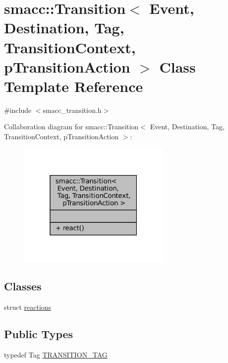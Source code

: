 \hypertarget{classsmacc_1_1Transition}{}\section{smacc\+:\+:Transition$<$ Event, Destination, Tag, Transition\+Context, p\+Transition\+Action $>$ Class Template Reference}
\label{classsmacc_1_1Transition}


{\ttfamily \#include $<$smacc\+\_\+transition.\+h$>$}



Collaboration diagram for smacc\+:\+:Transition$<$ Event, Destination, Tag, Transition\+Context, p\+Transition\+Action $>$\+:
\nopagebreak
\begin{figure}[H]
\begin{center}
\leavevmode
\includegraphics[width=211pt]{classsmacc_1_1Transition__coll__graph}
\end{center}
\end{figure}
\subsection*{Classes}
\begin{DoxyCompactItemize}
\item 
struct \hyperlink{structsmacc_1_1Transition_1_1reactions}{reactions}
\end{DoxyCompactItemize}
\subsection*{Public Types}
\begin{DoxyCompactItemize}
\item 
typedef Tag \hyperlink{classsmacc_1_1Transition_a672e883135344c4aea140381dd4d1c1d}{T\+R\+A\+N\+S\+I\+T\+I\+O\+N\+\_\+\+T\+AG}
\end{DoxyCompactItemize}
